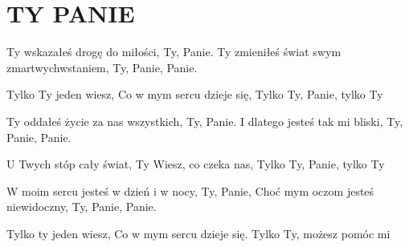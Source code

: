 \documentclass[../../../songbook.tex]{subfiles}
\begin{document}
\TabPositions{8cm} %
\section*{TY PANIE}
{}
\vspace{0.5cm}
Ty wskazałeś drogę do miłości, 				 \newline
Ty, Panie.									 \newline
Ty zmieniłeś świat swym zmartwychwstaniem, 	 \newline
Ty, Panie, Panie.							 \newline

\-\hspace{1cm} Tylko Ty jeden wiesz,		 \newline
\-\hspace{1cm} Co w mym sercu dzieje się,	 \newline
\-\hspace{1cm} Tylko Ty, Panie, tylko Ty	 \newline

Ty oddałeś życie za nas wszystkich, 			\newline
Ty, Panie. 			\newline
I dlatego jesteś tak mi bliski,  			\newline
Ty, Panie, Panie. 			\newline

\-\hspace{1cm} U Twych stóp cały świat,  			\newline
\-\hspace{1cm} Ty Wiesz, co czeka nas, 			\newline
\-\hspace{1cm} Tylko Ty, Panie, tylko Ty 			\newline

W moim sercu jesteś w dzień i w nocy,  			\newline
Ty, Panie, 			\newline
Choć mym oczom jesteś niewidoczny,  			\newline
Ty, Panie, Panie. 			\newline

\-\hspace{1cm} Tylko ty jeden wiesz,  			\newline
\-\hspace{1cm} Co w mym sercu dzieje się. 			\newline
\-\hspace{1cm} Tylko Ty, możesz pomóc mi 			\newline
\end{document}
